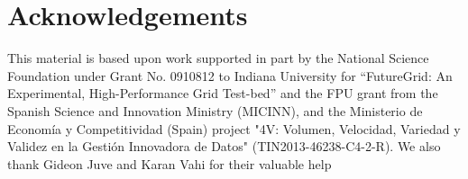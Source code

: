\documentclass[final,5p,times,twocolumn]{elsarticle}
\begin{document}








\section*{Acknowledgements}

This material is based upon work supported in part by the National Science Foundation under Grant No. 0910812 to Indiana University for ``FutureGrid: An Experimental, High-Performance Grid Test-bed'' and the FPU grant from the Spanish Science and Innovation Ministry (MICINN), and the Ministerio de Econom\'ia y Competitividad (Spain) project "4V: Volumen, Velocidad, Variedad y Validez en la Gesti\'on Innovadora de Datos" (TIN2013-46238-C4-2-R). We also thank Gideon Juve and Karan Vahi for their valuable help




\end{document}
